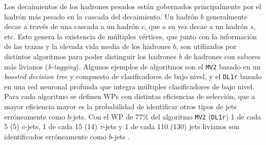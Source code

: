 Los decaimientos de los hadrones pesados están gobernados principalmente por el hadrón más pesado en la cascada del decaimiento. Un hadrón $b$ generalmente decae a través de una cascada a un hadrón $c$, que a su vez decae a un hadrón $s$, etc. Esto genera la existencia de múltiples 
vértices, que junto con la información de las trazas y la elevada vida media de los hadrones $b$, son utilizados por distintos algoritmos para poder distinguir los hadrones $b$ de hadrones con sabores más livianos (\textit{b-tagging}). Algunos ejemplos de algoritmos \cite{FTAG-2018-01} son el \texttt{MV2} basado en un \textit{boosted decision tree} y compuesto de clasificadores de bajo nivel, y el \texttt{DL1r} \cite{FTAG-2018-01, ATL-PHYS-PUB-2020-009} basado en una red neuronal profunda que integra múltiples clasificadores de bajo nivel. Para cada algoritmo se definen WPs con distintas eficiencias de selección, que a mayor eficiencia mayor es la probabilidad de identificar otros tipos de jets erróneamente como $b$-jets. Con el WP de 77\% del algoritmo \texttt{MV2} (\texttt{DL1r}) 1 de cada 5 (5) $c$-jets, 1 de cada 15 (14) $\tau$-jets y 1 de cada 110 (130) jets livianos son identificados erróneamente como $b$-jets \cite{FTAG-2018-01}.



